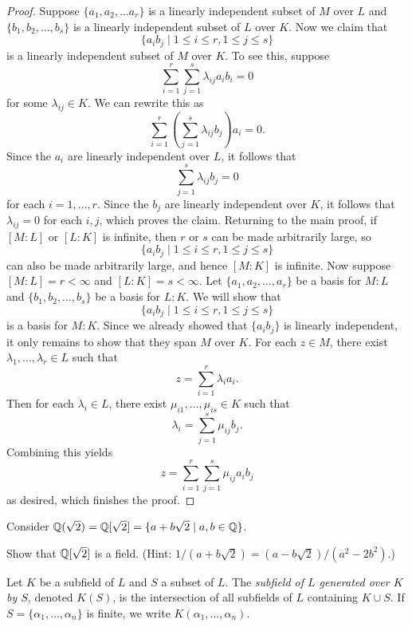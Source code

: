 \begin{proof}
  Suppose $\{a_1, a_2, \dots a_r\}$ is a linearly
  independent subset of $M$ over $L$ and
  $\{b_1, b_2, \dots, b_s\}$ is a linearly
  independent subset of $L$ over $K$.
  Now we claim that
  \[
    \{a_i b_j \mid 1 \le i \le r, 1 \le j \le s\}
  \]
  is a linearly independent subset of $M$ over $K$.
  To see this, suppose
  \[
    \sum_{i = 1}^r \sum_{j = 1}^s \lambda_{ij} a_i b_i = 0
  \]
  for some $\lambda_{ij} \in K$. We can rewrite this as
  \[
    \sum_{i = 1}^r \left(\sum_{j = 1}^s \lambda_{ij} b_j\right) a_i = 0.
  \]
  Since the $a_i$ are linearly independent over $L$,
  it follows that
  \[
    \sum_{j = 1}^s \lambda_{ij} b_j = 0
  \]
  for each $i = 1, \dots, r$. Since the $b_j$ are
  linearly independent over $K$, it follows that
  $\lambda_{ij} = 0$ for each $i, j$, which proves
  the claim. Returning to the main proof,
  if $[M : L]$ or $[L : K]$ is infinite,
  then $r$ or $s$ can be made arbitrarily large,
  so
  \[
    \{a_i b_j \mid 1 \le i \le r, 1 \le j \le s\}
  \]
  can also be made arbitrarily large, and hence
  $[M : K]$ is infinite. Now suppose
  $[M : L] = r < \infty$ and $[L : K] = s < \infty$. Let
  $\{a_1, a_2, \dots, a_r\}$ be a basis for $M : L$ and
  $\{b_1, b_2, \dots, b_s\}$ be a basis for $L : K$.
  We will show that
  \[
    \{a_i b_j \mid 1 \le i \le r, 1 \le j \le s\}
  \]
  is a basis for $M : K$. Since we already showed that
  $\{a_i b_j\}$ is linearly independent, it only remains
  to show that they span $M$ over $K$. For each $z \in M$,
  there exist $\lambda_1, \dots, \lambda_r \in L$ such
  that
  \[z = \sum_{i = 1}^r \lambda_i a_i.\]
  Then for each $\lambda_i \in L$, there exist
  $\mu_{i 1}, \dots, \mu_{i s} \in K$ such that
  \[
    \lambda_i = \sum_{j = 1}^s \mu_{i j} b_j.
  \]
  Combining this yields
  \[
    z = \sum_{i = 1}^r \sum_{j = 1}^s \mu_{i j} a_i b_j
  \]
  as desired, which finishes the proof.
\end{proof}

\begin{example}
  Consider $\mathbb{Q}(\sqrt{2}) = \mathbb{Q}[\sqrt{2}] = \{a + b\sqrt{2} \mid a, b \in \mathbb{Q}\}$.
\end{example}

\begin{exercise}
  Show that $\mathbb{Q}[\sqrt{2}]$ is a field.
  (Hint: $1 / (a + b\sqrt{2}) = (a - b\sqrt{2}) / (a^2 - 2b^2)$.)
\end{exercise}

\begin{definition}
  Let $K$ be a subfield of $L$ and $S$ a subset of
  $L$. The \emph{subfield of $L$ generated over $K$ by $S$},
  denoted $K(S)$, is the intersection of all subfields
  of $L$ containing $K \cup S$. If
  $S = \{\alpha_1, \dots, \alpha_n\}$ is finite,
  we write $K(\alpha_1, \dots, \alpha_n)$.
\end{definition}

